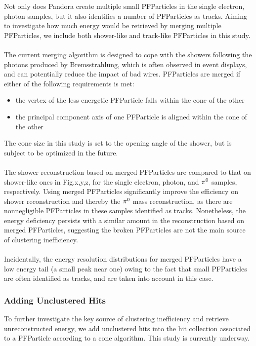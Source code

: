 Not only does Pandora create multiple small PFParticles in
the single electron, photon samples,
but it also identifies a number of PFParticles as tracks.
Aiming to investigate how much energy would be retrieved by merging
multiple PFParticles, we include both shower-like and track-like
PFParticles in this study.\\
\\
The current merging algorithm is designed to cope with the showers
following the photons produced by Bremsstrahlung,
which is often observed in event displays,
and can potentially reduce the impact of bad wires.
PFParticles are merged if either of the following requirements is met:
\begin{itemize}
\item the vertex of the less energetic PFParticle falls within the 
      cone of the other
\item the principal component axis of one PFParticle is aligned
      within the cone of the other
\end{itemize}
The cone size in this study is set to the opening angle of the shower,
but is subject to be optimized in the future.\\
\\
The shower reconstruction based on merged PFParticles are compared
to that on shower-like ones in Fig.x,y,z,
for the single electron, photon, and ${\pi}^0$ samples, respectively.
Using merged PFParticles significantly improve the efficiency on
shower reconstruction and thereby the ${\pi}^0$ mass reconstruction,
as there are nonnegligible PFParticles in these samples identified
as tracks.
Nonetheless, the energy deficiency persists with a similar amount in
the reconstruction based on merged PFParticles, suggesting the broken
PFParticles are not the main source of clustering inefficiency.\\
\\
Incidentally,
the energy resolution distributions for merged PFParticles have a 
low energy tail (a small peak near one) owing to the fact that
small PFParticles are often identified as tracks, and are taken into
account in this case.

\subsubsection{Adding Unclustered Hits}
\label{sec:adding_hits}

To further investigate the key source of clustering inefficiency
and retrieve unreconstructed energy,
we add unclustered hits into the hit collection associated to a 
PFParticle according to a cone algorithm.
This study is currently underway.

